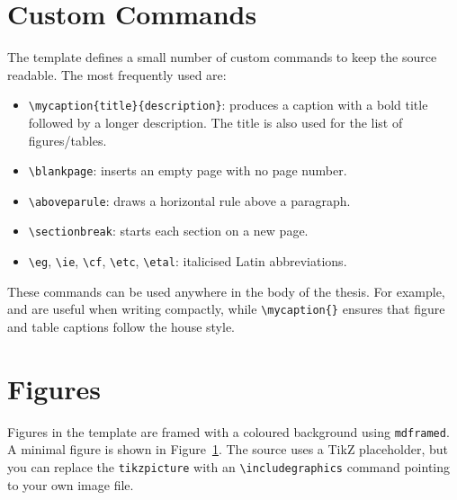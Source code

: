 \section{Custom Commands}\label{ch2sec:commands}

The template defines a small number of custom commands to keep the source readable. The most frequently used are:

\begin{itemize}
\item \verb|\mycaption{title}{description}|: produces a caption with a bold title followed by a longer description. The title is also used for the list of figures/tables.
\item \verb|\blankpage|: inserts an empty page with no page number.
\item \verb|\aboveparule|: draws a horizontal rule above a paragraph.
\item \verb|\sectionbreak|: starts each section on a new page.
\item \verb|\eg|, \verb|\ie|, \verb|\cf|, \verb|\etc|, \verb|\etal|: italicised Latin abbreviations.
\end{itemize}

These commands can be used anywhere in the body of the thesis. For example, \eg{} and \ie{} are useful when writing compactly, while \verb|\mycaption{}| ensures that figure and table captions follow the house style.


\section{Figures}\label{ch2sec:figures}

Figures in the template are framed with a coloured background using \texttt{mdframed}. A minimal figure is shown in Figure~\ref{fig:background-demo}. The source uses a TikZ placeholder, but you can replace the \texttt{tikzpicture} with an \verb|\includegraphics| command pointing to your own image file.

\begin{figure}[h]
\centering
{}
\label{fig:background-demo}
\end{figure}

